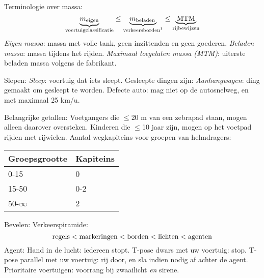 \begin{outline}
\1 Terminologie over massa:
	\begin{equation}\label{eq:mass}
		\underbrace{m_\text{eigen}}_\text{voertuigclassificatie} \leq \underbrace{m_\text{beladen}\,}_\text{verkeersborden\footnotemark} \leq \underbrace{\,\text{MTM}\,}_\text{rijbewijzen}
	\end{equation}
	\2 \emph{Eigen massa}: massa met volle tank, geen inzittenden en geen goederen.
	\2 \emph{Beladen massa}: massa tijdens het rijden.
	\2 \emph{Maximaal toegelaten massa (MTM)}: uiterste beladen massa volgens de fabrikant.
	
\1 Slepen:
	\2 \emph{Sleep}: voertuig dat iets sleept.
	\2 Gesleepte dingen zijn:
		\3 \emph{Aanhangwagen}: ding gemaakt om gesleept te worden. 
		\3 Defecte auto: mag niet op de autosnelweg, en met maximaal 25 km/u.

\1 Belangrijke getallen:
	\2 Voetgangers die $\leq$20 m van een zebrapad staan, mogen alleen daarover oversteken.
	\2 Kinderen die $\leq$10 jaar zijn, mogen op het voetpad rijden met rijwielen.
	\2 Aantal wegkapiteins voor groepen van helmdragers:
\begin{center}
\begin{tabular}{ll}
Groepsgrootte & Kapiteins \\ \hline
0-15 & 0 \\
15-50 & 0-2 \\
50-$\infty$ & 2
\end{tabular}
\end{center}

\1 Bevelen:
	\2 Verkeerspiramide:
	\begin{equation}
		\text{regels} < \text{markeringen} < \text{borden} < \text{lichten} < \text{agenten}\vspace{-1em}
	\end{equation}
	\2 Agent:
		\3 Hand in de lucht: iedereen stopt.
		\3 T-pose dwars met uw voertuig: stop.
		\3 T-pose parallel met uw voertuig: rij door, en sla indien nodig af achter de agent.
	\2 Prioritaire voertuigen: voorrang bij zwaailicht \emph{en} sirene.
\end{outline}


